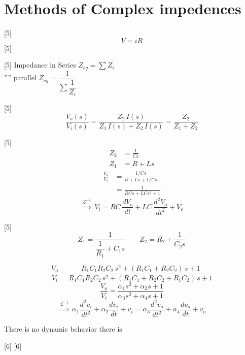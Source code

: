 \documentclass[11pt,a4paper]{article}
\begin{document}
\section{Methods of Complex impedences}

[5]
\[ V = iR \]
[5]

[5]
\noindent Impedance in Series \qquad $Z_{eq}=\sum Z_i$\\
\hspace*{3em}''\hspace{1.5em}'' parallel \qquad $Z_{eq}=\dfrac{1}{\sum \dfrac{1}{Z_i}}$

[5]
\[
\frac{V_o(s)}{V_i(s)} = \frac{Z_2\,I(s)}{Z_1\,I(s) + Z_2\,I(s)} = \frac{Z_2}{Z_1 + Z_2}
\]

[5]
\begin{align*}
Z_2 &= \frac{1}{Cs}\\
Z_1 &= R + Ls
\end{align*}
\begin{align*}
\frac{V_o}{V_i} &= \frac{1/Cs}{R + Ls + 1/Cs}\\
&= \frac{1}{RCs + LCs^{2} + 1}
\end{align*}
\[
\overset{\mathcal{L}^{-1}}{\Longrightarrow}\ V_i = RC\,\frac{dV_o}{dt} + LC\,\frac{d^{2}V_o}{dt^{2}} + V_o
\]

[5]
\[
Z_1 = \frac{1}{\dfrac{1}{R_1} + C_1 s}
\qquad
Z_2 = R_2 + \frac{1}{C_2 s}
\]

\[
\frac{V_o}{V_i} = \frac{R_1C_1R_2C_2\,s^{2} + (R_1C_1 + R_2C_2)\,s + 1}{R_1C_1R_2C_2\,s^{2} + (R_1C_1 + R_2C_2 + R_1C_2)\,s + 1}
\]
\[
\frac{V_o}{V_i} = \frac{\alpha_1 s^{2} + \alpha_2 s + 1}{\alpha_3 s^{2} + \alpha_4 s + 1}
\]
\[
\overset{\mathcal{L}^{-1}}{\Longrightarrow}\ \alpha_1\frac{d^{2}v_i}{dt^{2}} + \alpha_2\frac{dv_i}{dt} + v_i = \alpha_3\frac{d^{2}v_o}{dt^{2}} + \alpha_4\frac{dv_o}{dt} + v_o
\]

\noindent There is no dynamic behavior \quad there is 

[6]
[6]
\end{document}
